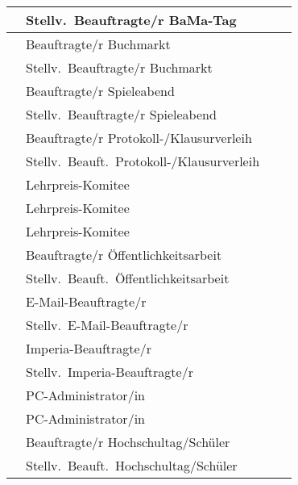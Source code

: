 \documentclass[sitzung=fsv-konstituierend]{fsphys-protokoll}
\begin{document}
\begin{longtable}{| r @{ } l | l | c |}
	\fsrnum & Stellv.\ Beauftragte/r BaMa-Tag
		& &
	\\ \hline
	\fsrnum & Beauftragte/r Buchmarkt
		& &
	\\ \hline
	\fsrnum & Stellv.\ Beauftragte/r Buchmarkt
		& &
	\\ \hline
	\fsrnum & Beauftragte/r Spieleabend
		& &
	\\ \hline
	\fsrnum & Stellv.\ Beauftragte/r Spieleabend
		& &
	\\ \hline
	\fsrnum & Beauftragte/r Protokoll-/Klausurverleih
		& &
	\\ \hline
	\fsrnum & Stellv.\ Beauft.\ Protokoll-/Klausurverleih
		& &
	\\ \hline
	\fsrnum & Lehrpreis-Komitee
		& &
	\\ \hline
	\fsrnum & Lehrpreis-Komitee
		& &
	\\ \hline
	\fsrnum & Lehrpreis-Komitee
		& &
	\\ \hline
	\fsrnum & Beauftragte/r Öffentlichkeitsarbeit
		& &
	\\ \hline
	\fsrnum & Stellv.\ Beauft.\ Öffentlichkeitsarbeit
		& &
	\\ \hline
	\fsrnum & E-Mail-Beauftragte/r
		& &
	\\ \hline
	\fsrnum & Stellv.\ E-Mail-Beauftragte/r
		& &
	\\ \hline
	\fsrnum & Imperia-Beauftragte/r
		& &
	\\ \hline
	\fsrnum & Stellv.\ Imperia-Beauftragte/r
		& &
	\\ \hline
	\fsrnum & PC-Administrator/in
		& &
	\\ \hline
	\fsrnum & PC-Administrator/in
		& &
	\\ \hline
	\fsrnum & Beauftragte/r Hochschultag/Schüler
		& &
	\\ \hline
	\fsrnum & Stellv.\ Beauft.\ Hochschultag/Schüler
		& &
	\\ \hline
\end{longtable}

\clearpage

\appendix
\end{document}
